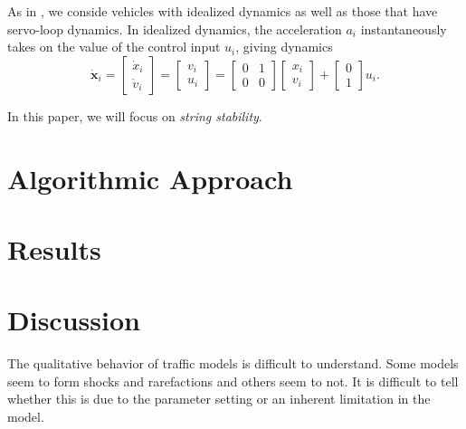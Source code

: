 \documentclass[11pt]{article}
\newcommand{\mb}{\mathbf}
\begin{document}
\begin{multicols}{2}
As in \cite{Peng}, we conside vehicles with idealized dynamics as well as those that have servo-loop dynamics. In idealized dynamics, the acceleration $a_i$ instantaneously takes on the value of the control input $u_i$, giving dynamics
\[\dot{\mb x}_i = \left[\begin{array}{c} \dot{x}_i\\ \dot{v}_i \end{array} \right] = \left[\begin{array}{c} v_i\\ u_i \end{array} \right] =  \left[\begin{array}{cc} 0 & 1\\ 0 & 0 \end{array} \right] \left[\begin{array}{c} x_i\\ v_i \end{array} \right] +  \left[\begin{array}{c} 0\\ 1 \end{array} \right]u_i. \]

In this paper, we will focus on {\em string stability}.

\section{Algorithmic Approach}

\section{Results}

\section{Discussion}  

The qualitative behavior of traffic models is difficult to understand. Some models seem to form shocks and rarefactions and others seem to not. It is difficult to tell whether this is due to the parameter setting or an inherent limitation in the model.

\end{multicols}
\end{document}
